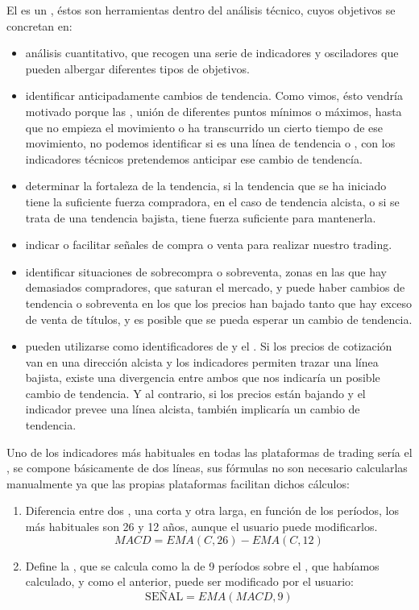 El  es un , éstos son herramientas dentro del análisis técnico, cuyos objetivos se concretan en: 
\begin{itemize}
    \item análisis cuantitativo, que recogen una serie de indicadores y osciladores que pueden albergar diferentes tipos de objetivos. 
    \item identificar anticipadamente cambios de tendencia. Como vimos, ésto vendría motivado porque las , unión de diferentes puntos mínimos o máximos, hasta que no empieza el movimiento o ha transcurrido un cierto tiempo de ese movimiento, no podemos identificar si es una línea de tendencia  o , con los indicadores técnicos pretendemos anticipar ese cambio de tendencía.
    \item determinar la fortaleza de la tendencia, si la tendencia que se ha iniciado tiene la suficiente fuerza compradora, en el caso de tendencia alcista, o si se trata de una tendencia bajista, tiene fuerza suficiente para mantenerla.
    \item indicar o facilitar señales de compra o venta para realizar nuestro trading.
    \item identificar situaciones de sobrecompra o sobreventa, zonas en las que hay demasiados compradores, que saturan el mercado, y puede haber cambios de tendencia o sobreventa en los que los precios han bajado tanto que hay exceso de venta de títulos, y es posible que se pueda esperar un cambio de tendencia.
    \item pueden utilizarse como identificadores de  y el . Si los precios de cotización van en una dirección alcista y los indicadores permiten trazar una línea bajista, existe una divergencia entre ambos que nos indicaría un posible cambio de tendencia. Y al contrario, si los precios están bajando y el indicador prevee una línea alcista, también implicaría un cambio de tendencia.
\end{itemize}

Uno de los indicadores más habituales en todas las plataformas de trading sería el , se compone básicamente de dos  líneas, sus fórmulas no son necesario calcularlas manualmente ya que las propias plataformas facilitan dichos cálculos:

\begin{enumerate}
    \item Diferencia entre dos , una corta y otra larga, en función de los períodos, los más habituales son 26 y 12 años, aunque el usuario puede modificarlos.
    $$\mathit{MACD} = \mathit{EMA}(C,26) - EMA(C,12)$$
    \item Define la  , que se calcula como la  de 9 períodos sobre el , que habíamos calculado, y como el anterior, puede ser modificado por el usuario:
    $$\text{SEÑAL} = \mathit{EMA}(\mathit{MACD},9) $$
\end{enumerate}

